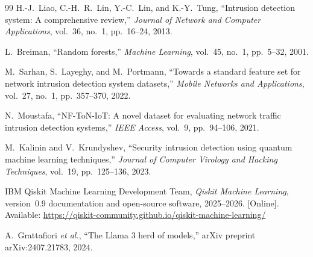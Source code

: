 \documentclass[conference]{IEEEtran}
\begin{document}
\begin{thebibliography}{99}
H.-J.~Liao, C.-H.~R.~Lin, Y.-C.~Lin, and K.-Y.~Tung,
``Intrusion detection system: A comprehensive review,''
\textit{Journal of Network and Computer Applications},
vol.~36, no.~1, pp.~16--24, 2013.

L.~Breiman,
``Random forests,''
\textit{Machine Learning}, vol.~45, no.~1, pp.~5--32, 2001.

M.~Sarhan, S.~Layeghy, and M.~Portmann,
``Towards a standard feature set for network intrusion detection
system datasets,''
\textit{Mobile Networks and Applications},
vol.~27, no.~1, pp.~357--370, 2022.

N.~Moustafa,
``NF-ToN-IoT: A novel dataset for evaluating network traffic
intrusion detection systems,''
\textit{IEEE Access}, vol.~9, pp.~94--106, 2021.

M.~Kalinin and V.~Krundyshev,
``Security intrusion detection using quantum machine learning
techniques,''
\textit{Journal of Computer Virology and Hacking Techniques},
vol.~19, pp.~125--136, 2023.

IBM Qiskit Machine Learning Development Team,
\textit{Qiskit Machine Learning}, version~0.9 documentation and
open-source software, 2025--2026. [Online]. Available:
\url{https://qiskit-community.github.io/qiskit-machine-learning/}

A.~Grattafiori \textit{et al.},
``The Llama 3 herd of models,''
arXiv preprint arXiv:2407.21783, 2024.

\end{thebibliography}
\end{document}
